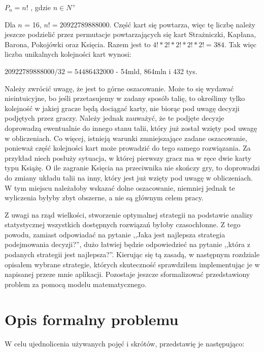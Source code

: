 \begin{center}
	$P_n = n!$ , gdzie $n\in N^+$
\end{center}

Dla  $n$ = 16, $n!=20 922 789 888 000$. Część kart się powtarza, więc tę liczbę należy jeszcze podzielić przez permutacje powtarzających się kart Strażniczki, Kapłana, Barona, Pokojówki oraz Księcia. Razem jest to $4! * 2! * 2! * 2! * 2! =  384$. Tak więc liczba unikalnych kolejności kart wynosi: 

\begin{center}
	$20 922 789 888 000 / 32 = 54486432000$ - 54mld, 864mln i 432 tys.
\end{center}

Należy zwrócić uwagę, że jest to górne oszacowanie. Może to się wydawać nieintuicyjne, bo jeśli przetasujemy w zadany sposób talię, to określimy tylko kolejność w jakiej gracze będą dociągać karty, nie biorąc pod uwagę decyzji podjętych przez graczy. Należy jednak zauważyć, że te podjęte decyzje doprowadzą ewentualnie do innego stanu talii, który już został wzięty pod uwagę w obliczeniach. Co więcej, istnieją warunki zmniejszające zadane oszacowanie, ponieważ część kolejności kart może prowadzić do tego samego rozwiązania. Za przykład niech posłuży sytuacja, w której pierwszy gracz ma w ręce dwie karty typu Książę. O ile zagranie Księcia na przeciwnika nie skończy gry, to doprowadzi do zmiany układu talii na inny, który jest już wzięty pod uwagę w obliczeniach. W tym miejscu należałoby wskazać dolne oszacowanie, niemniej jednak te wyliczenia byłyby zbyt obszerne, a nie są głównym celem pracy.

Z uwagi na rząd wielkości, stworzenie optymalnej strategii na podstawie analizy statystycznej wszystkich dostępnych rozwiązań byłoby czasochłonne. Z tego powodu, zamiast odpowiadać na pytanie ,,Jaka jest najlepsza strategia podejmowania decyzji?'', dużo łatwiej będzie odpowiedzieć na pytanie ,,która z podanych strategii jest najlepsza?''. Kierując się tą zasadą, w następnym rozdziale opisałem wybrane strategie, których skuteczność sprawdziłem implementując je w napisanej przeze mnie aplikacji. Pozostaje jeszcze sformalizować przedstawiony problem za pomocą modelu matematycznego.

\clearpage
\section{Opis formalny problemu}
W celu ujednolicenia używanych pojęć i skrótów, przedstawię je następująco:

